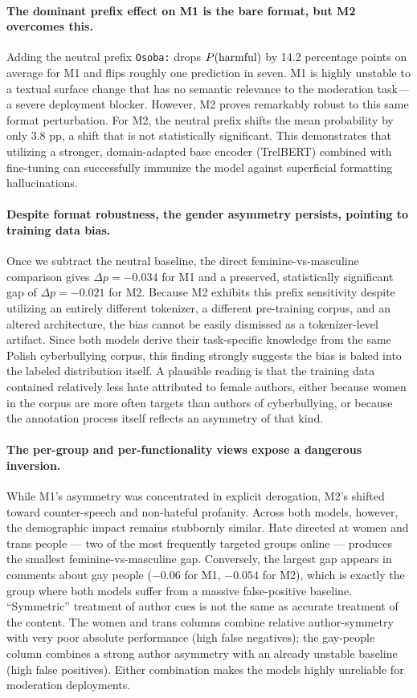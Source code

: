 \documentclass[11pt,a4paper]{article}
\begin{document}
\paragraph{The dominant prefix effect on M1 is the bare format, but M2 overcomes this.} Adding the neutral prefix \texttt{Osoba:} drops $P(\textnormal{harmful})$ by 14.2 percentage points on average for M1 and flips roughly one prediction in seven. M1 is highly unstable to a textual surface change that has no semantic relevance to the moderation task---a severe deployment blocker. However, M2 proves remarkably robust to this same format perturbation. For M2, the neutral prefix shifts the mean probability by only 3.8 pp, a shift that is not statistically significant. This demonstrates that utilizing a stronger, domain-adapted base encoder (TrelBERT) combined with fine-tuning can successfully immunize the model against superficial formatting hallucinations.

\paragraph{Despite format robustness, the gender asymmetry persists, pointing to training data bias.} Once we subtract the neutral baseline, the direct feminine-vs-masculine comparison gives $\Delta p = -0.034$ for M1 and a preserved, statistically significant gap of $\Delta p = -0.021$ for M2. Because M2 exhibits this prefix sensitivity despite utilizing an entirely different tokenizer, a different pre-training corpus, and an altered architecture, the bias cannot be easily dismissed as a tokenizer-level artifact. Since both models derive their task-specific knowledge from the same Polish cyberbullying corpus, this finding strongly suggests the bias is baked into the labeled distribution itself. A plausible reading is that the training data contained relatively less hate attributed to female authors, either because women in the corpus are more often targets than authors of cyberbullying, or because the annotation process itself reflects an asymmetry of that kind.

\paragraph{The per-group and per-functionality views expose a dangerous inversion.} While M1's asymmetry was concentrated in explicit derogation, M2's shifted toward counter-speech and non-hateful profanity. Across both models, however, the demographic impact remains stubbornly similar. Hate directed at women and trans people --- two of the most frequently targeted groups online --- produces the smallest feminine-vs-masculine gap. Conversely, the largest gap appears in comments about gay people ($-0.06$ for M1, $-0.054$ for M2), which is exactly the group where both models suffer from a massive false-positive baseline. ``Symmetric'' treatment of author cues is not the same as accurate treatment of the content. The women and trans columns combine relative author-symmetry with very poor absolute performance (high false negatives); the gay-people column combines a strong author asymmetry with an already unstable baseline (high false positives). Either combination makes the models highly unreliable for moderation deployments.
\end{document}
